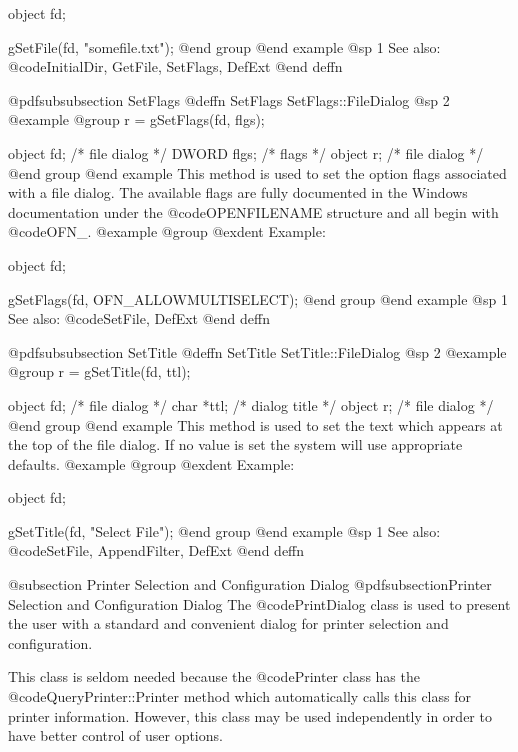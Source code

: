 object  fd;

gSetFile(fd, "somefile.txt");
@end group
@end example
@sp 1
See also:  @code{InitialDir, GetFile, SetFlags, DefExt}
@end deffn







@pdfsubsubsection {SetFlags}
@deffn {SetFlags} SetFlags::FileDialog
@sp 2
@example
@group
r = gSetFlags(fd, flgs);

object  fd;     /*  file dialog  */
DWORD   flgs;   /*  flags        */
object  r;      /*  file dialog  */
@end group
@end example
This method is used to set the option flags associated with a file dialog.
The available flags are fully documented in the Windows documentation
under the @code{OPENFILENAME} structure and all begin with @code{OFN_}.
@example
@group
@exdent Example:

object  fd;

gSetFlags(fd, OFN_ALLOWMULTISELECT);
@end group
@end example
@sp 1
See also:  @code{SetFile, DefExt}
@end deffn















@pdfsubsubsection {SetTitle}
@deffn {SetTitle} SetTitle::FileDialog
@sp 2
@example
@group
r = gSetTitle(fd, ttl);

object  fd;     /*  file dialog  */
char    *ttl;   /*  dialog title */
object  r;      /*  file dialog  */
@end group
@end example
This method is used to set the text which appears at the top of the
file dialog.  If no value is set the system will use appropriate defaults.
@example
@group
@exdent Example:

object  fd;

gSetTitle(fd, "Select File");
@end group
@end example
@sp 1
See also:  @code{SetFile, AppendFilter, DefExt}
@end deffn





@subsection Printer Selection and Configuration Dialog
@pdfsubsection{Printer Selection and Configuration Dialog}
The @code{PrintDialog} class is used to present the user with a standard
and convenient dialog for printer selection and configuration.

This class is seldom needed because the @code{Printer} class has
the @code{QueryPrinter::Printer} method which automatically calls
this class for printer information.  However, this class may be used
independently in order to have better control of user options.


